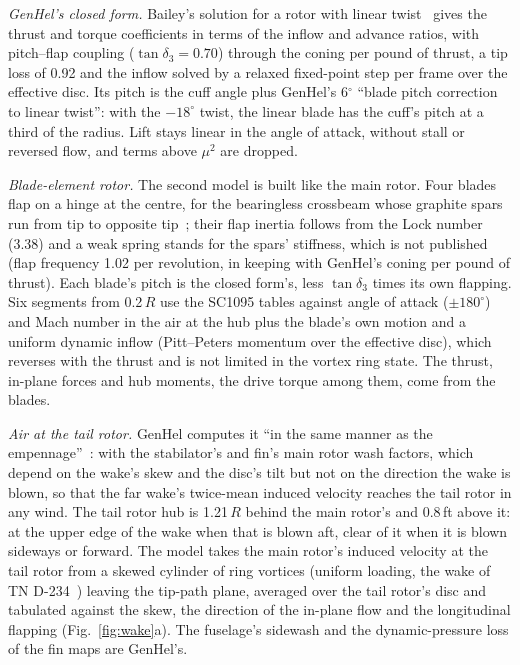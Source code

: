 \documentclass[10pt,a4paper,twocolumn]{article}
\begin{document}
\emph{GenHel's closed form.} Bailey's solution for a rotor with linear twist~\cite{gh} gives the thrust and torque coefficients in
terms of the inflow and advance ratios, with pitch--flap coupling ($\tan\delta_3=0.70$) through the coning per pound of thrust, a tip
loss of 0.92 and the inflow solved by a relaxed fixed-point step per frame over the effective disc. Its pitch is the cuff angle plus
GenHel's 6$^\circ$ ``blade pitch correction to linear twist'': with the $-18^\circ$ twist, the linear blade has the cuff's pitch at a third
of the radius. Lift stays linear in the angle of attack, without stall or reversed flow, and terms above $\mu^2$ are dropped.

\emph{Blade-element rotor.} The second model is built like the main rotor. Four blades flap on a hinge at the centre, for the bearingless
crossbeam whose graphite spars run from tip to opposite tip~\cite{tm}; their flap inertia follows from the Lock number (3.38) and a weak
spring stands for the spars' stiffness, which is not published (flap frequency 1.02 per revolution, in keeping with GenHel's coning per
pound of thrust). Each blade's pitch is the closed form's, less $\tan\delta_3$ times its own flapping. Six segments from 0.2\,$R$ use the SC1095
tables against angle of attack ($\pm180^\circ$) and Mach number in the air at the hub plus the blade's own motion and a uniform dynamic inflow
(Pitt--Peters momentum over the effective disc), which reverses with the thrust and is not limited in the vortex ring state. The thrust,
in-plane forces and hub moments, the drive torque among them, come from the blades.

\emph{Air at the tail rotor.} GenHel computes it ``in the same manner as the empennage''~\cite{gh}: with the stabilator's and fin's main
rotor wash factors, which depend on the wake's skew and the disc's tilt but not on the direction the wake is blown, so that the far wake's
twice-mean induced velocity reaches the tail rotor in any wind. The tail rotor hub is 1.21\,$R$ behind the main rotor's and 0.8\,ft above it:
at the upper edge of the wake when that is blown aft, clear of it when it is blown sideways or forward. The model takes the main rotor's
induced velocity at the tail rotor from a skewed cylinder of ring vortices (uniform loading, the wake of TN D-234~\cite{heyson}) leaving the
tip-path plane, averaged over the tail rotor's disc and tabulated against the skew, the direction of the in-plane flow and the longitudinal
flapping (Fig.~\ref{fig:wake}a). The fuselage's sidewash and the dynamic-pressure loss of the fin maps are GenHel's.
\end{document}
